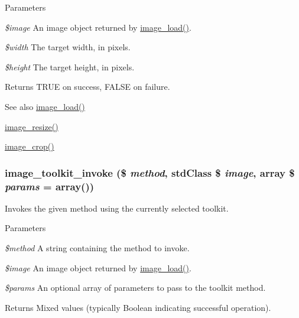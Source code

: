 \begin{DoxyParams}{Parameters}
\item[{\em \$image}]An image object returned by \hyperlink{group__image_ga96098e5b039dc3906a656fa889a04776}{image\_\-load()}. \item[{\em \$width}]The target width, in pixels. \item[{\em \$height}]The target height, in pixels.\end{DoxyParams}
\begin{DoxyReturn}{Returns}
TRUE on success, FALSE on failure.
\end{DoxyReturn}
\begin{DoxySeeAlso}{See also}
\hyperlink{group__image_ga96098e5b039dc3906a656fa889a04776}{image\_\-load()} 

\hyperlink{group__image_ga991594ed9388b740bc98a162b6bbc449}{image\_\-resize()} 

\hyperlink{group__image_gaaf7d382a8ec190f746478848ed309fe7}{image\_\-crop()} 
\end{DoxySeeAlso}
\hypertarget{group__image_ga49dd01a9f7b8037f15b99e098f068cb7}{
\subsubsection[{image\_\-toolkit\_\-invoke}]{\setlength{\rightskip}{0pt plus 5cm}image\_\-toolkit\_\-invoke (\$ {\em method}, \/  stdClass \$ {\em image}, \/  array \$ {\em params} = {\ttfamily array()})}}
\label{group__image_ga49dd01a9f7b8037f15b99e098f068cb7}
Invokes the given method using the currently selected toolkit.


\begin{DoxyParams}{Parameters}
\item[{\em \$method}]A string containing the method to invoke. \item[{\em \$image}]An image object returned by \hyperlink{group__image_ga96098e5b039dc3906a656fa889a04776}{image\_\-load()}. \item[{\em \$params}]An optional array of parameters to pass to the toolkit method.\end{DoxyParams}
\begin{DoxyReturn}{Returns}
Mixed values (typically Boolean indicating successful operation). 
\end{DoxyReturn}
